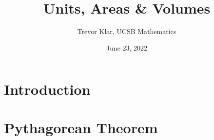 \documentclass
[handout]
{beamer}
\title{Units, Areas \& Volumes}
\author{Trevor Klar, UCSB Mathematics}
\date{June 23, 2022}
\begin{document}
\section{Introduction}










\section*{Pythagorean Theorem}
\end{document}
